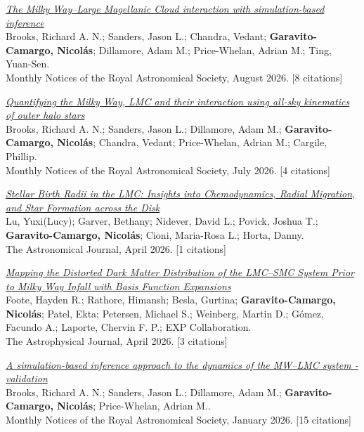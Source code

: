 \documentclass[14pt]{article}
\begin{document}
\begin{etaremune}
\item \textit{\href{https://ui.adsabs.harvard.edu/abs/2026MNRAS.550g1254B/abstract}{The Milky Way--Large Magellanic Cloud interaction with simulation-based inference}}\\
  {\small \color{darkgray} Brooks, Richard A. N.; Sanders, Jason L.; Chandra, Vedant; \textbf{Garavito-Camargo, Nicolás}; Dillamore, Adam M.; Price-Whelan, Adrian M.; Ting, Yuan-Sen.\\
  Monthly Notices of the Royal Astronomical Society, August 2026. [8 citations]}

\item \textit{\href{https://ui.adsabs.harvard.edu/abs/2026MNRAS.549ag926B/abstract}{Quantifying the Milky Way, LMC and their interaction using all-sky kinematics of outer halo stars}}\\
  {\small \color{darkgray} Brooks, Richard A. N.; Sanders, Jason L.; Dillamore, Adam M.; \textbf{Garavito-Camargo, Nicolás}; Chandra, Vedant; Price-Whelan, Adrian M.; Cargile, Phillip.\\
  Monthly Notices of the Royal Astronomical Society, July 2026. [4 citations]}

\item \textit{\href{https://ui.adsabs.harvard.edu/abs/2026AJ....171..230L/abstract}{Stellar Birth Radii in the LMC: Insights into Chemodynamics, Radial Migration, and Star Formation across the Disk}}\\
  {\small \color{darkgray} Lu, Yuxi(Lucy); Garver, Bethany; Nidever, David L.; Povick, Joshua T.; \textbf{Garavito-Camargo, Nicolás}; Cioni, Maria-Rosa L.; Horta, Danny.\\
  The Astronomical Journal, April 2026. [1 citations]}

\item \textit{\href{https://ui.adsabs.harvard.edu/abs/2026ApJ..1001...37F/abstract}{Mapping the Distorted Dark Matter Distribution of the LMC--SMC System Prior to Milky Way Infall with Basis Function Expansions}}\\
  {\small \color{darkgray} Foote, Hayden R.; Rathore, Himansh; Besla, Gurtina; \textbf{Garavito-Camargo, Nicolás}; Patel, Ekta; Petersen, Michael S.; Weinberg, Martin D.; Gómez, Facundo A.; Laporte, Chervin F. P.; EXP Collaboration.\\
  The Astrophysical Journal, April 2026. [3 citations]}

\item \textit{\href{https://ui.adsabs.harvard.edu/abs/2026MNRAS.545f2111B/abstract}{A simulation-based inference approach to the dynamics of the MW--LMC system - validation}}\\
  {\small \color{darkgray} Brooks, Richard A. N.; Sanders, Jason L.; Dillamore, Adam M.; \textbf{Garavito-Camargo, Nicolás}; Price-Whelan, Adrian M..\\
  Monthly Notices of the Royal Astronomical Society, January 2026. [15 citations]}


\end{etaremune}
\end{document}
